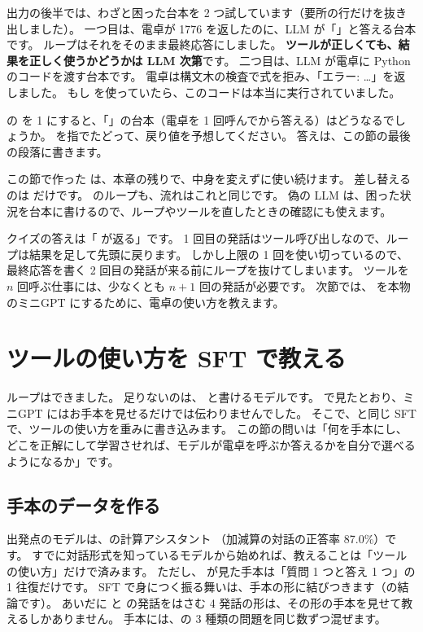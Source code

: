 出力の後半では、わざと困った台本を 2 つ試しています（要所の行だけを抜き出しました）。
一つ目は、電卓が 1776 を返したのに、LLM が「」と答える台本です。
ループはそれをそのまま最終応答にしました。
\textbf{ツールが正しくても、結果を正しく使うかどうかは LLM 次第}です。
二つ目は、LLM が電卓に Python のコードを渡す台本です。
電卓は構文木の検査で式を拒み、「エラー: …」を返しました。
もし  を使っていたら、このコードは本当に実行されていました。

\begin{quiz}
 の  を 1 にすると、「」の台本（電卓を 1 回呼んでから答える）はどうなるでしょうか。
を指でたどって、戻り値を予想してください。
答えは、この節の最後の段落に書きます。
\end{quiz}

この節で作った  は、本章の残りで、中身を変えずに使い続けます。
差し替えるのは  だけです。
のループも、流れはこれと同じです。
偽の LLM は、困った状況を台本に書けるので、ループやツールを直したときの確認にも使えます。

クイズの答えは「 が返る」です。
1 回目の発話はツール呼び出しなので、ループは結果を足して先頭に戻ります。
しかし上限の 1 回を使い切っているので、最終応答を書く 2 回目の発話が来る前にループを抜けてしまいます。
ツールを $n$ 回呼ぶ仕事には、少なくとも $n+1$ 回の発話が必要です。
次節では、 を本物のミニGPT にするために、電卓の使い方を教えます。

\section{ツールの使い方を SFT で教える}\label{sec:agent-sft}

ループはできました。
足りないのは、 と書けるモデルです。
で見たとおり、ミニGPT にはお手本を見せるだけでは伝わりませんでした。
そこで、と同じ SFT で、ツールの使い方を重みに書き込みます。
この節の問いは「何を手本にし、どこを正解にして学習させれば、モデルが電卓を呼ぶか答えるかを自分で選べるようになるか」です。

\subsection{手本のデータを作る}

出発点のモデルは、の計算アシスタント （加減算の対話の正答率 87.0\%）です。
すでに対話形式を知っているモデルから始めれば、教えることは「ツールの使い方」だけで済みます。
ただし、 が見た手本は「質問 1 つと答え 1 つ」の 1 往復だけです。
SFT で身につく振る舞いは、手本の形に結びつきます（の結論です）。
あいだに  と  の発話をはさむ 4 発話の形は、その形の手本を見せて教えるしかありません。
手本には、の 3 種類の問題を同じ数ずつ混ぜます。

